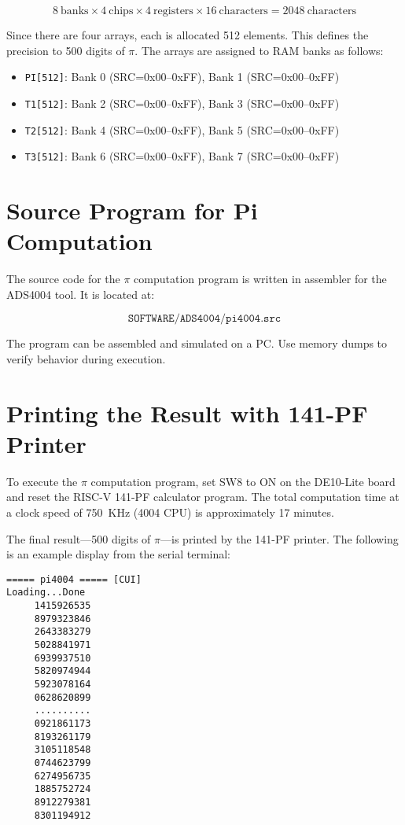 \[
8~\text{banks} \times 4~\text{chips} \times 4~\text{registers} \times 16~\text{characters} = 2048~\text{characters}
\]

Since there are four arrays, each is allocated 512 elements. This defines the precision to 500 digits of $\pi$. The arrays are assigned to RAM banks as follows:

\begin{itemize}
  \item \texttt{PI[512]}: Bank 0 (SRC=0x00--0xFF), Bank 1 (SRC=0x00--0xFF)
  \item \texttt{T1[512]}: Bank 2 (SRC=0x00--0xFF), Bank 3 (SRC=0x00--0xFF)
  \item \texttt{T2[512]}: Bank 4 (SRC=0x00--0xFF), Bank 5 (SRC=0x00--0xFF)
  \item \texttt{T3[512]}: Bank 6 (SRC=0x00--0xFF), Bank 7 (SRC=0x00--0xFF)
\end{itemize}

\section{Source Program for Pi Computation}
The source code for the $\pi$ computation program is written in assembler for the ADS4004 tool. It is located at:


\[
\texttt{SOFTWARE/ADS4004/pi4004.src}
\]


The program can be assembled and simulated on a PC. Use memory dumps to verify behavior during execution.

\section{Printing the Result with 141-PF Printer}
To execute the $\pi$ computation program, set SW8 to ON on the DE10-Lite board and reset the RISC-V 141-PF calculator program. The total computation time at a clock speed of 750~KHz (4004 CPU) is approximately 17 minutes.

The final result—500 digits of $\pi$—is printed by the 141-PF printer. The following is an example display from the serial terminal:

\begin{verbatim}
===== pi4004 ===== [CUI]
Loading...Done
     1415926535      
     8979323846      
     2643383279      
     5028841971      
     6939937510      
     5820974944      
     5923078164      
     0628620899      
     ..........
     0921861173      
     8193261179      
     3105118548      
     0744623799      
     6274956735      
     1885752724      
     8912279381      
     8301194912
\end{verbatim}






